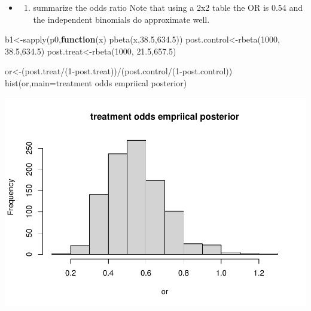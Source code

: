 \documentclass[
]{book}
\newenvironment{Shaded}{\begin{snugshade}}{\end{snugshade}}
\newcommand{\AttributeTok}[1]{\textcolor[rgb]{0.77,0.63,0.00}{#1}}
\newcommand{\ControlFlowTok}[1]{\textcolor[rgb]{0.13,0.29,0.53}{\textbf{#1}}}
\newcommand{\DecValTok}[1]{\textcolor[rgb]{0.00,0.00,0.81}{#1}}
\newcommand{\FloatTok}[1]{\textcolor[rgb]{0.00,0.00,0.81}{#1}}
\newcommand{\FunctionTok}[1]{\textcolor[rgb]{0.00,0.00,0.00}{#1}}
\newcommand{\NormalTok}[1]{#1}
\newcommand{\OtherTok}[1]{\textcolor[rgb]{0.56,0.35,0.01}{#1}}
\newcommand{\SpecialCharTok}[1]{\textcolor[rgb]{0.00,0.00,0.00}{#1}}
\newcommand{\StringTok}[1]{\textcolor[rgb]{0.31,0.60,0.02}{#1}}
\providecommand{\tightlist}{%
  \setlength{\itemsep}{0pt}\setlength{\parskip}{0pt}}
\theoremstyle{definition}
\theoremstyle{definition}
\theoremstyle{definition}
\theoremstyle{definition}
\theoremstyle{remark}
\begin{document}
\begin{itemize}
\item
  \begin{enumerate}
  \def\labelenumi{(\alph{enumi})}
  \setcounter{enumi}{1}
  \tightlist
  \item
    summarize the odds ratio
    Note that using a 2x2 table the OR is 0.54 and the independent binomials do approximate well.
  \end{enumerate}
\end{itemize}

\begin{Shaded}
\begin{Highlighting}[]
\NormalTok{b1}\OtherTok{\textless{}{-}}\FunctionTok{sapply}\NormalTok{(p0,}\ControlFlowTok{function}\NormalTok{(x) }\FunctionTok{pbeta}\NormalTok{(x,}\FloatTok{38.5}\NormalTok{,}\FloatTok{634.5}\NormalTok{))}
\NormalTok{ post.control}\OtherTok{\textless{}{-}}\FunctionTok{rbeta}\NormalTok{(}\DecValTok{1000}\NormalTok{, }\FloatTok{38.5}\NormalTok{,}\FloatTok{634.5}\NormalTok{)}
\NormalTok{  post.treat}\OtherTok{\textless{}{-}}\FunctionTok{rbeta}\NormalTok{(}\DecValTok{1000}\NormalTok{, }\FloatTok{21.5}\NormalTok{,}\FloatTok{657.5}\NormalTok{)}

\NormalTok{  or}\OtherTok{\textless{}{-}}\NormalTok{(post.treat}\SpecialCharTok{/}\NormalTok{(}\DecValTok{1}\SpecialCharTok{{-}}\NormalTok{post.treat))}\SpecialCharTok{/}\NormalTok{(post.control}\SpecialCharTok{/}\NormalTok{(}\DecValTok{1}\SpecialCharTok{{-}}\NormalTok{post.control))}
  \FunctionTok{hist}\NormalTok{(or,}\AttributeTok{main=}\StringTok{\textquotesingle{}treatment odds empriical posterior\textquotesingle{}}\NormalTok{)}
\end{Highlighting}
\end{Shaded}

\includegraphics{_main_files/figure-latex/unnamed-chunk-34-1.pdf}
\end{document}
